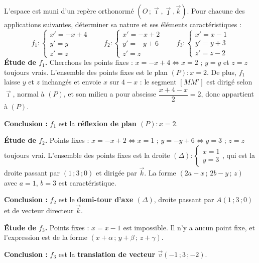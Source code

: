 \documentclass[11pt]{article}
\begin{document}
\begin{exoresolu}
L'espace est muni d'un repère orthonormé $(O\,;\vec{\imath},\vec{\jmath},\vec{k})$. Pour chacune des applications suivantes, déterminer sa nature et ses éléments caractéristiques :
\[f_{1}:\begin{cases}x'=-x+4\\ y'=y\\ z'=z\end{cases}\qquad f_{2}:\begin{cases}x'=-x+2\\ y'=-y+6\\ z'=z\end{cases}\qquad f_{3}:\begin{cases}x'=x-1\\ y'=y+3\\ z'=z-2\end{cases}\]
\tcblower
\textbf{Étude de $f_{1}$.} Cherchons les points fixes : $x=-x+4\Leftrightarrow x=2$ ; $y=y$ et $z=z$ toujours vrais. L'ensemble des points fixes est le plan $(P):x=2$. De plus, $f_{1}$ laisse $y$ et $z$ inchangés et envoie $x$ sur $4-x$ : le segment $[MM']$ est dirigé selon $\vec{\imath}$, normal à $(P)$, et son milieu a pour abscisse $\dfrac{x+4-x}{2}=2$, donc appartient à $(P)$.

\textbf{Conclusion :} $f_{1}$ est la \textbf{réflexion de plan $(P):x=2$}.

\textbf{Étude de $f_{2}$.} Points fixes : $x=-x+2\Leftrightarrow x=1$ ; $y=-y+6\Leftrightarrow y=3$ ; $z=z$ toujours vrai. L'ensemble des points fixes est la droite $(\Delta):\begin{cases}x=1\\ y=3\end{cases}$, qui est la droite passant par $(1\,;3\,;0)$ et dirigée par $\vec{k}$. La forme $(2a-x\,;\,2b-y\,;\,z)$ avec $a=1$, $b=3$ est caractéristique.

\textbf{Conclusion :} $f_{2}$ est le \textbf{demi-tour d'axe $(\Delta)$}, droite passant par $A(1\,;3\,;0)$ et de vecteur directeur $\vec{k}$.

\textbf{Étude de $f_{3}$.} Points fixes : $x=x-1$ est impossible. Il n'y a aucun point fixe, et l'expression est de la forme $(x+\alpha\,;\,y+\beta\,;\,z+\gamma)$.

\textbf{Conclusion :} $f_{3}$ est la \textbf{translation de vecteur $\vec{v}(-1\,;3\,;-2)$}.
\end{exoresolu}
\end{document}
